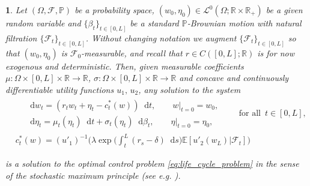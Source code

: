 \documentclass[11pt,oneside,english,reqno,dvipsnames,table]{amsart}
\numberwithin{equation}{section}
\theoremstyle{plain}
\newtheorem{thm}{\protect\theoremname}
\theoremstyle{definition}
\theoremstyle{remark}
\theoremstyle{plain}
\theoremstyle{plain}
\theoremstyle{plain}
\theoremstyle{plain}
\theoremstyle{plain}
\theoremstyle{plain}
\theoremstyle{plain}
\providecommand{\theoremname}{Theorem}
\newcommand{\cA}{\mathcal{A}}
\newcommand{\cF}{\mathcal{F}}
\newcommand{\EE}{\mathbb{E}}
\newcommand{\RR}{\mathbb{R}}
\newcommand{\dd}{\mathop{}\!\mathrm{d}}
\newcommand{\mcF}{\mathcal{F}}
\newcommand{\mcJ}{\mathcal{J}}
\newcommand{\mbP}{\mathbb{P}}
\newcommand{\mbR}{\mathbb{R}}
\newcommand{\msL}{\mathscr{L}}
\newcommand{\tzero}{|_{t=0}}
\numberwithin{thm}{section}
\begin{document}





\begin{thm}\label{thm:life_cycle_optimal_rep}
    Let $(\Omega,\mcF,\mbP)$ be a probability space, $(w_0,\eta_0) \in \msL^0(\Omega;\mbR \times \mbR_+)$ be a given random variable and $\{\beta_t\}_{t\in [0,L]}$ be a standard $\mbP$-Brownian motion  with natural filtration $\{\mcF_t\}_{t\in[0,L]}$. Without changing notation we augment $\{\mcF_t\}_{t\in[0,L]}$ so that $(w_0,\eta_0)$ is $\mcF_0$-measurable, and recall that $r\in C([0,L];\RR)$ is for now exogenous and deterministic. Then, given measurable coefficients $\mu:\Omega\times [0,L]\times \mbR\to \mbR$, $\sigma :\Omega\times [0,L]\times \mbR\to \mbR$ and concave and continuously differentiable utility functions $u_1,\,u_2$, any solution to the system
    \begin{equation}\label{eq:life_cycle_explicit}
    \begin{aligned}
    &\begin{aligned}
          &\dd w_t = (r_tw_t +\eta_t -c^*_t(w))\dd t,\qquad w\tzero = w_0,\\
&\dd \eta_t = \mu_t(\eta_t)\dd t + \sigma_t(\eta_t)\dd \beta_t,\qquad \eta\tzero = \eta_0,
    \end{aligned}
        \qquad \text{for all }\,t\in [0,L],\\
        &c^*_t(w)= (u'_1)^{-1} \bigg( \lambda \exp\bigg( \int_t^L (r_s-\delta) \dd s \bigg)  \EE \left[ u'_2(w_L) |\cF_t\right]\bigg)
    \end{aligned}
    \end{equation}

     is a solution  to the optimal control problem \eqref{eq:life_cycle_problem}
%
%  
    in the sense of the stochastic maximum principle (see e.g. \cite[Thm.~6.4.6 and 6.4.7]{pham_09_continuous}). 
\end{thm}
\end{document}
